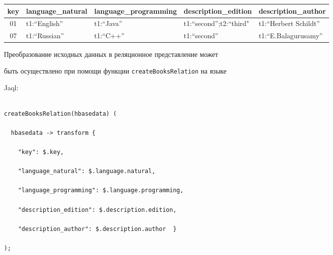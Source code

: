 \begin{table}\footnotesize  %

\begin{center}


\vspace*{2ex}



\tabcolsep=4.3pt

\begin{tabular}{|c|l|l|l|l|}

\hline

key&\multicolumn{1}{c|}{language\_natural}&\multicolumn{1}{c|}{language\_programming}&

\multicolumn{1}{c|}{description\_edition}&\multicolumn{1}{c|}{description\_author}\\

\hline

01&t1:``English''&t1:``Java''&t1:``second'';t2:``third"&t1:``Herbert Schildt''\\

07&t1:``Russian''&t1:``C++''&t1:``second''&t1:``E.Balagurusamy''\\

\hline

\end{tabular}

\end{center}

\vspace*{-12pt}

\end{table}



      Преобразование исходных данных в реляционное представление может

быть осуществлено при помощи функции \verb"createBooksRelation" на языке

Jaql:

      \begin{verbatim}

createBooksRelation(hbasedata) (

  hbasedata -> transform {

    "key": $.key,

    "language_natural": $.language.natural,

    "language_programming": $.language.programming,

    "description_edition": $.description.edition,

    "description_author": $.description.author  }

);

\end{verbatim}



